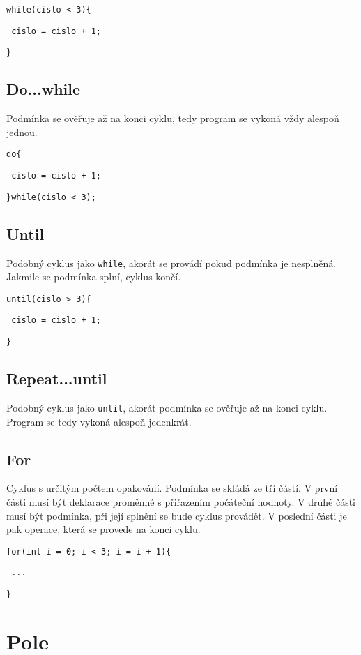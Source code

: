 \documentclass[czech]{thesiskiv}
\begin{document}

\texttt{while(cislo < 3)\{}

\texttt{    cislo = cislo + 1;}

\texttt{\}}

\subsection{Do...while}
Podmínka se ověřuje až na konci cyklu, tedy program se vykoná vždy alespoň jednou.


\texttt{do\{}

\texttt{    cislo = cislo + 1;}

\texttt{\}while(cislo < 3);}

\subsection{Until}
Podobný cyklus jako \texttt{while}, akorát se provádí pokud podmínka je nesplněná.
Jakmile se podmínka splní, cyklus končí.


\texttt{until(cislo > 3)\{}

\texttt{    cislo = cislo + 1;}

\texttt{\}}

\subsection{Repeat...until}
Podobný cyklus jako \texttt{until}, akorát podmínka se ověřuje až na konci cyklu.
Program se tedy vykoná alespoň jedenkrát.

\subsection{For}
Cyklus s určitým počtem opakování. Podmínka se skládá ze tří částí.
V první části musí být deklarace proměnné s přiřazením počáteční hodnoty.
V druhé části musí být podmínka, při její splnění se bude cyklus provádět.
V poslední části je pak operace, která se provede na konci cyklu.


\texttt{for(int i = 0; i < 3; i = i + 1)\{} 

\texttt{    ...}

\texttt{\}}
               
\section{Pole}
\end{document}
